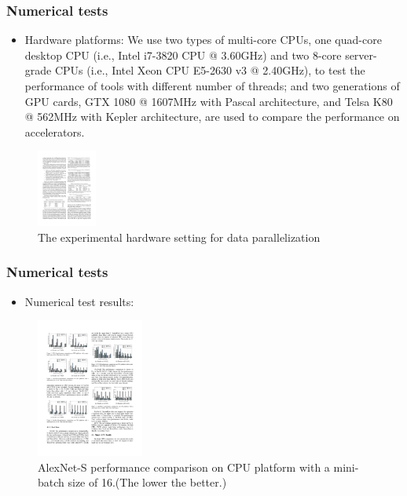 \begin{frame}
	\MyLogo
	\frametitle{Numerical tests}  
	\begin{itemize}
		\item Hardware platforms: We use two types of multi-core
		CPUs, one quad-core desktop CPU (i.e., Intel i7-3820 CPU
		@ 3.60GHz) and two 8-core server-grade CPUs (i.e., Intel
		Xeon CPU E5-2630 v3 @ 2.40GHz), to test the performance of tools with different number of threads; and two
		generations of GPU cards, GTX 1080 @ 1607MHz with
		Pascal architecture, and Telsa K80 @ 562MHz with Kepler
		architecture, are used to compare the performance on accelerators. 
	\end{itemize}
	
	\begin{figure}[htbp] 
		\includegraphics[height=1in]{figures/platforms.pdf} 
		\caption{The experimental hardware setting for data parallelization}
	\end{figure}
	
\end{frame}

%

\begin{frame}
	\MyLogo
	\frametitle{Numerical tests}  
	\begin{itemize}
		\item Numerical test results:
	\end{itemize}
	\begin{figure}[htbp] 
		\includegraphics[height=1.8in]{figures/AlexNet-S1.pdf} 
		\caption{AlexNet-S performance comparison on CPU platform with a mini-batch size of 16.(The lower the better.)}
	\end{figure}	
\end{frame}

